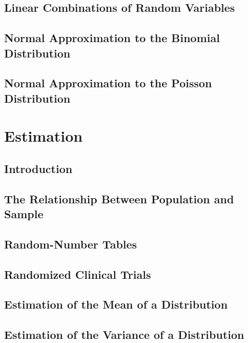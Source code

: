 \documentclass[12pt,]{article}
\theoremstyle{definition}
\theoremstyle{definition}
\theoremstyle{definition}
\theoremstyle{remark}
\begin{document}
\subsection{Linear Combinations of Random
Variables}\label{linear-combinations-of-random-variables}

\subsection{Normal Approximation to the Binomial
Distribution}\label{normal-approximation-to-the-binomial-distribution}

\subsection{Normal Approximation to the Poisson
Distribution}\label{normal-approximation-to-the-poisson-distribution}

\section{Estimation}\label{estimation}

\subsection{Introduction}\label{introduction-3}

\subsection{The Relationship Between Population and
Sample}\label{the-relationship-between-population-and-sample}

\subsection{Random-Number Tables}\label{random-number-tables}

\subsection{Randomized Clinical
Trials}\label{randomized-clinical-trials}

\subsection{Estimation of the Mean of a
Distribution}\label{estimation-of-the-mean-of-a-distribution}

\subsection{Estimation of the Variance of a
Distribution}\label{estimation-of-the-variance-of-a-distribution}
\end{document}
